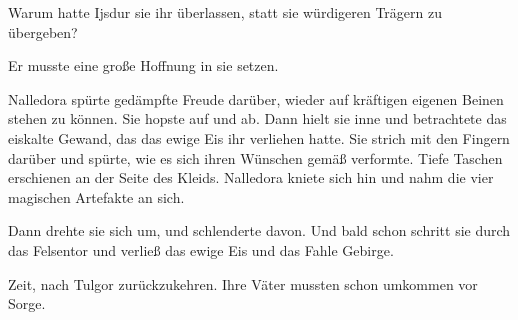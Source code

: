 Warum hatte Ijsdur sie ihr überlassen, statt sie würdigeren Trägern zu übergeben?

Er musste eine große Hoffnung in sie setzen.

Nalledora spürte gedämpfte Freude darüber, wieder auf kräftigen eigenen Beinen stehen zu können. Sie hopste auf und ab. Dann hielt sie inne und betrachtete das eiskalte Gewand, das das ewige Eis ihr verliehen hatte. Sie strich mit den Fingern darüber und spürte, wie es sich ihren Wünschen gemäß verformte. Tiefe Taschen erschienen an der Seite des Kleids. Nalledora kniete sich hin und nahm die vier magischen Artefakte an sich.

Dann drehte sie sich um, und schlenderte davon. Und bald schon schritt sie durch das Felsentor und verließ das ewige Eis und das Fahle Gebirge.

Zeit, nach Tulgor zurückzukehren. Ihre Väter mussten schon umkommen vor Sorge.








